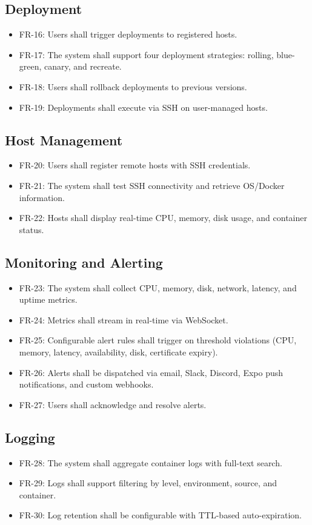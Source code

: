 \documentclass[12pt,a4paper,twoside]{report}
\begin{document}
\subsection{Deployment}
\begin{itemize}[noitemsep]
  \item FR-16: Users shall trigger deployments to registered hosts.
  \item FR-17: The system shall support four deployment strategies: rolling, blue-green, canary, and recreate.
  \item FR-18: Users shall rollback deployments to previous versions.
  \item FR-19: Deployments shall execute via SSH on user-managed hosts.
\end{itemize}

\subsection{Host Management}
\begin{itemize}[noitemsep]
  \item FR-20: Users shall register remote hosts with SSH credentials.
  \item FR-21: The system shall test SSH connectivity and retrieve OS/Docker information.
  \item FR-22: Hosts shall display real-time CPU, memory, disk usage, and container status.
\end{itemize}

\subsection{Monitoring and Alerting}
\begin{itemize}[noitemsep]
  \item FR-23: The system shall collect CPU, memory, disk, network, latency, and uptime metrics.
  \item FR-24: Metrics shall stream in real-time via WebSocket.
  \item FR-25: Configurable alert rules shall trigger on threshold violations (CPU, memory, latency, availability, disk, certificate expiry).
  \item FR-26: Alerts shall be dispatched via email, Slack, Discord, Expo push notifications, and custom webhooks.
  \item FR-27: Users shall acknowledge and resolve alerts.
\end{itemize}

\subsection{Logging}
\begin{itemize}[noitemsep]
  \item FR-28: The system shall aggregate container logs with full-text search.
  \item FR-29: Logs shall support filtering by level, environment, source, and container.
  \item FR-30: Log retention shall be configurable with TTL-based auto-expiration.
\end{itemize}
\end{document}
